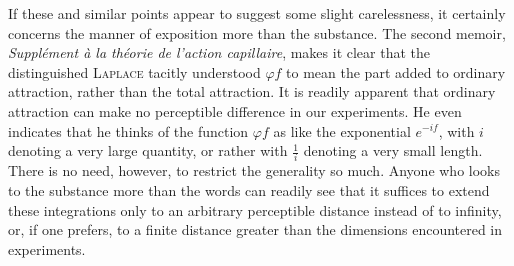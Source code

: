 If these and similar points appear to suggest some slight carelessness, it certainly concerns the manner of exposition more than the substance. The second memoir, \textit{Supplément à la théorie de l’action capillaire}, makes it clear that the distinguished \textsc{Laplace} tacitly understood $\varphi f$ to mean the part added to ordinary attraction, rather than the total attraction. It is readily apparent that ordinary attraction can make no perceptible difference in our experiments. He even indicates that he thinks of the function $\varphi f$ as like the exponential $e^{-if}$, with $i$ denoting a very large quantity, or rather with $\frac{1}{i}$ denoting a very small length. There is no need, however, to restrict the generality so much. Anyone who looks to the substance more than the words can readily see that it suffices to extend these integrations only to an arbitrary perceptible distance instead of to infinity, or, if one prefers, to a finite distance greater than the dimensions encountered in experiments.

